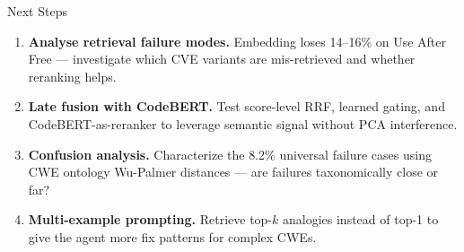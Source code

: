 \documentclass[aspectratio=169,10pt]{beamer}
\begin{document}
\begin{frame}{Next Steps}

  \begin{enumerate}\setlength{\itemsep}{0.5em}

    \item[\textcolor{c1}{\faIcon{search}}]
      \textbf{Analyse retrieval failure modes.}
      Embedding loses 14--16\% on Use After Free --- investigate
      which CVE variants are mis-retrieved and whether reranking helps.

    \vspace{0.3em}
    \item[\textcolor{c5}{\faIcon{balance-scale}}]
      \textbf{Late fusion with CodeBERT.}
      Test score-level RRF, learned gating, and CodeBERT-as-reranker
      to leverage semantic signal without PCA interference.

    \vspace{0.3em}
    \item[\textcolor{c3}{\faIcon{th}}]
      \textbf{Confusion analysis.}
      Characterize the 8.2\% universal failure cases using CWE ontology
      Wu-Palmer distances --- are failures taxonomically close or far?

    \vspace{0.3em}
    \item[\textcolor{c2}{\faIcon{code-branch}}]
      \textbf{Multi-example prompting.}
      Retrieve top-$k$ analogies instead of top-1 to give the agent
      more fix patterns for complex CWEs.

  \end{enumerate}
\end{frame}


\begin{frame}[plain]
\centering
\vspace{3em}
\end{frame}
\end{document}
